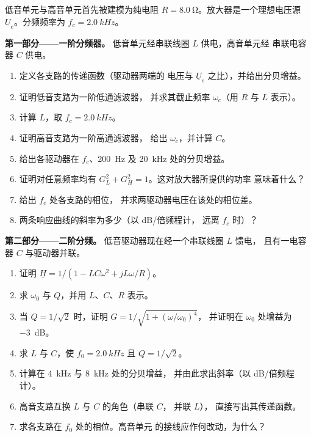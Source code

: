 \begin{problem}
\label{pb:b1:filters-transfer-functions:1}
低音单元与高音单元首先被建模为纯电阻
$R = \qty{8.0}{\ohm}$。放大器是一个理想电压源
$\underline U_e$。分频频率为 $f_c = \qty{2.0}{kHz}$。

\medskip
\noindent\textbf{第一部分——一阶分频器。}
低音单元经串联线圈 $L$ 供电，高音单元经
串联电容器 $C$ 供电。
\begin{enumerate}
  \item 定义各支路的传递函数（驱动器两端的
        电压与 $\underline U_e$ 之比），并给出分贝增益。
  \item 证明低音支路为一阶低通滤波器，
        并求其截止频率 $\omega_c$（用 $R$ 与 $L$ 表示）。
  \item 计算 $L$，取 $f_c = \qty{2.0}{kHz}$。
  \item 证明高音支路为一阶高通滤波器，
        给出 $\omega_c$，并计算 $C$。
  \item 给出各驱动器在 $f_c$、\qty{200}{Hz}
        及 \qty{20}{kHz} 处的分贝增益。
  \item 证明对任意频率均有 $G_L^2 + G_H^2 = 1$。这对放大器所提供的功率
        意味着什么？
  \item 给出 $f_c$ 处各支路的相位，
        并求两驱动器电压在该处的相位差。
  \item 两条响应曲线的斜率为多少（以 dB/倍频程计，
        远离 $f_c$ 时）？
\end{enumerate}

\medskip
\noindent\textbf{第二部分——二阶分频。}
低音驱动器现在经一个串联线圈 $L$ 馈电，
且有一电容器 $C$ 与驱动器并联。
\begin{enumerate}[resume]
  \item 证明 $\underline H = 1/(1 - LC\omega^2 + jL\omega/R)$。
  \item 求 $\omega_0$ 与 $Q$，并用 $L$、$C$、$R$ 表示。
  \item 当 $Q = 1/\sqrt2$ 时，证明 $G = 1/\sqrt{1 + (\omega/\omega_0)^4}$，
        并证明在 $\omega_0$ 处增益为 \qty{-3}{dB}。
  \item 求 $L$ 与 $C$，使 $f_0 = \qty{2.0}{kHz}$ 且 $Q = 1/\sqrt2$。
  \item 计算在 \qty{4}{kHz} 与 \qty{8}{kHz} 处的分贝增益，
        并由此求出斜率（以 dB/倍频程计）。
  \item 高音支路互换 $L$ 与 $C$ 的角色（串联 $C$，
        并联 $L$），
        直接写出其传递函数。
  \item 求各支路在 $f_0$ 处的相位。高音单元
        的接线应作何改动，为什么？
\end{enumerate}


\end{problem}

